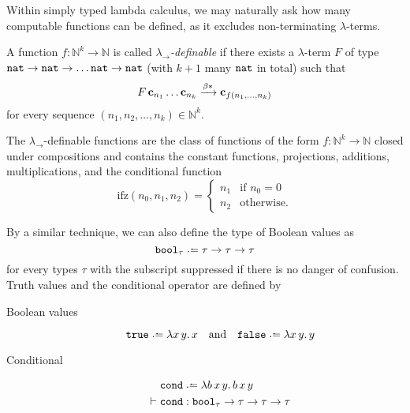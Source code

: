 Within simply typed lambda calculus, we may naturally ask how many computable
functions can be defined, as it excludes non-terminating $\lambda$-terms. 
\begin{definition}
  A function $f\colon \mathbb{N}^k \to \mathbb{N}$ is called
  \emph{$\lambda_\to$-definable} if there exists a $\lambda$-term $F$
   of type $\mathtt{nat} \to \mathtt{nat} \to \dots \mathtt{nat} \to \mathtt{nat}$ (with $k+1$
  many $\mathtt{nat}$ in total) such that
  \[
    F\,\mathbf{c}_{n_1}\ldots\mathbf{c}_{n_k} \xrightarrow{\beta*} \mathbf{c}_{f(n_1, \dots, n_k)}
  \]
  for every sequence $(n_1, n_2, \ldots, n_k) \in \mathbb{N}^k$.
\end{definition}
\begin{theorem}
  The $\lambda_\to$-definable functions are the class of functions
  of the form $f\colon \mathbb{N}^k \to \mathbb{N}$ closed under compositions
  and contains the constant functions, projections, additions, multiplications,
  and the conditional function 
  \[
    \mathrm{ifz}(n_0, n_1, n_2) = 
    \begin{cases}
      n_1 & \text{if } n_0 = 0\\
      n_2 & \text{otherwise.}
    \end{cases}
  \]
\end{theorem}

By a similar technique, we can also define the type of Boolean values as
\[
  \bool_\tau \defeq \tau \to \tau \to \tau
\]
for every types $\tau$ with the subscript suppressed if there is no danger of
confusion.  Truth values and the conditional operator are defined by
\begin{description}
  \item[Boolean values]
      \[
        \true \defeq \lambda x\,y.\,x \\
        \quad\text{and}\quad
        \false \defeq \lambda x\,y.\,y \\
      \]
  \item[Conditional]
    \begin{align*}
      & \cond \defeq \lambda b\,x\,y.\, b\,x\,y\\
      \vdash {} & \cond : \bool_{\tau} \to \tau \to \tau \to \tau
    \end{align*}
\end{description}

